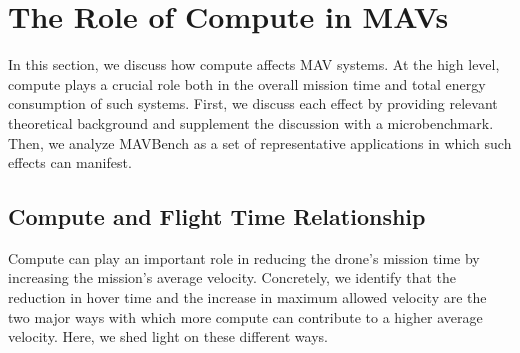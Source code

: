 \section{The Role of Compute in MAVs}
\label{sec:char}

In this section, we discuss how compute affects MAV systems. At the high level, compute plays a crucial role both in the overall mission time and total energy consumption of such systems. First, we discuss each effect by providing relevant  theoretical background and supplement the discussion with a microbenchmark. Then, we analyze MAVBench as a set of representative applications in which such effects can manifest.   %




\subsection{Compute and Flight Time Relationship}

Compute can play an important role in reducing the drone's mission time by increasing the mission's average velocity. Concretely, we identify that the reduction in hover time and the increase in maximum allowed velocity are the two major ways with which more compute can contribute to a higher average velocity. Here, we shed light on these different ways.

